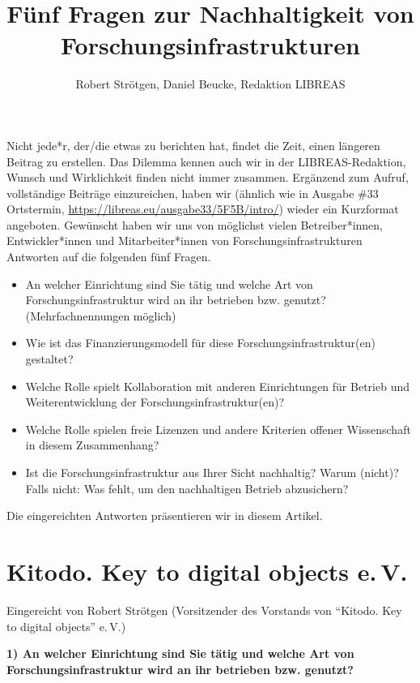 \documentclass[a4paper,
fontsize=11pt,
oneside,
numbers=noperiodatend,
parskip=half-,
bibliography=totoc,
final
]{scrartcl}
\title{\LARGE{Fünf Fragen zur Nachhaltigkeit von Forschungsinfrastrukturen}} %
\author{Robert Strötgen, Daniel Beucke, Redaktion LIBREAS} %
\date{}
\begin{document}
\maketitle
\thispagestyle{fancyplain} 


Nicht jede*r, der/die etwas zu berichten hat, findet die Zeit, einen
längeren Beitrag zu erstellen. Das Dilemma kennen auch wir in der
LIBREAS-Redaktion, Wunsch und Wirklichkeit finden nicht immer zusammen.
Ergänzend zum Aufruf, vollständige Beiträge einzureichen, haben wir
(ähnlich wie in Ausgabe \#33 Ortstermin,
\url{https://libreas.eu/ausgabe33/5F5B/intro/}) wieder ein Kurzformat
angeboten. Gewünscht haben wir uns von möglichst vielen Betreiber*innen,
Entwickler*innen und Mitarbeiter*innen von Forschungsinfrastrukturen
Antworten auf die folgenden fünf Fragen.

\begin{itemize}
\item
  An welcher Einrichtung sind Sie tätig und welche Art von
  Forschungsinfrastruktur wird an ihr betrieben bzw. genutzt?
  (Mehrfachnennungen möglich)
\item
  Wie ist das Finanzierungsmodell für diese Forschungsinfrastruktur(en)
  gestaltet?
\item
  Welche Rolle spielt Kollaboration mit anderen Einrichtungen für
  Betrieb und Weiterentwicklung der Forschungsinfrastruktur(en)?
\item
  Welche Rolle spielen freie Lizenzen und andere Kriterien offener
  Wissenschaft in diesem Zusammenhang?
\item
  Ist die Forschungsinfrastruktur aus Ihrer Sicht nachhaltig? Warum
  (nicht)? Falls nicht: Was fehlt, um den nachhaltigen Betrieb
  abzusichern?
\end{itemize}

Die eingereichten Antworten präsentieren wir in diesem Artikel.

\hypertarget{kitodo.-key-to-digital-objects-e.-v.}{%
\section{Kitodo. Key to digital objects e.\,V.}\label{kitodo.-key-to-digital-objects-e.-v.}}

Eingereicht von Robert Strötgen (Vorsitzender des Vorstands von
\enquote{Kitodo. Key to digital objects} e.\,V.)

\textbf{1) An welcher Einrichtung sind Sie tätig und welche Art von
Forschungsinfrastruktur wird an ihr betrieben bzw. genutzt?}
\end{document}
